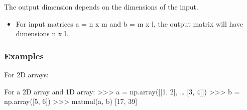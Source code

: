 \documentclass[letterpaper,10pt,english]{sphinxmanual}
\begin{document}
\begin{fulllineitems}
The output dimension depends on the dimensions of the input.
\begin{itemize}
\item {} 
For input matrices a = n x m and b = m x l, the output matrix will have
dimensions n x l.

\end{itemize}
\subsubsection*{Examples}

For 2\sphinxhyphen{}D arrays:

\begin{sphinxVerbatim}[commandchars=\\\{\}]
  \PYG{p}{[}\PYG{p}{[} \PYG{p}{]}
              \PYG{p}{[} \PYG{p}{]}\PYG{p}{]}
  \PYG{p}{[}\PYG{p}{[} \PYG{p}{]}
              \PYG{p}{[} \PYG{p}{]}\PYG{p}{]}
 
\end{sphinxVerbatim}

For a 2\sphinxhyphen{}D array and 1\sphinxhyphen{}D array:
\textgreater{}\textgreater{}\textgreater{} a = np.array({[}{[}1, 2{]},
…               {[}3, 4{]}{]})
\textgreater{}\textgreater{}\textgreater{} b = np.array({[}5, 6{]})
\textgreater{}\textgreater{}\textgreater{} matmul(a, b)
{[}17, 39{]}

\end{fulllineitems}
\end{document}
